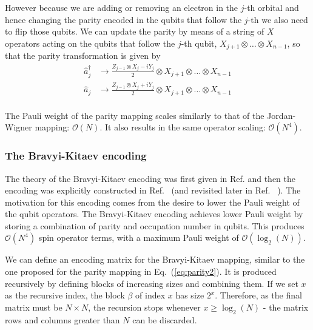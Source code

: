 However because we are adding or removing an electron in the $j$-th orbital and hence changing the parity encoded in the qubits that follow the $j$-th we also need to flip those qubits. We can update the parity by means of a string of $X$ operators acting on the qubits that follow the $j$-th qubit, $X_{j + 1} \otimes \dots \otimes X_{n - 1}$, so that the parity transformation is given by
\begin{equation}
\label{eq:parityladder2}
\begin{aligned}
\hat{a}_{j}^{\dagger} &\to \frac{Z_{j-1}\otimes X_{j} -i Y_{j}}{2} \otimes X_{j + 1} \otimes \dots \otimes X_{n-1} \\
\hat{a}_{j} &\to \frac{ Z_{j-1}\otimes X_{j} + i Y_{j}}{2} \otimes X_{j+1} \otimes \dots \otimes X_{n-1} \\
\end{aligned}
\end{equation}

The Pauli weight of the parity mapping scales similarly to that of the Jordan-Wigner mapping: $\mathcal{O}(N)$. It also results in the same operator scaling: $\mathcal{O}(N^4)$.  

\subsubsection{The Bravyi-Kitaev encoding} \label{sec:bravyi-kitaev}

The theory of the Bravyi-Kitaev encoding was first given in Ref. \cite{Bravyi2002} and then the encoding was explicitly constructed in Ref.~\cite{Seeley2012} (and revisited later in Ref.~ \cite{Tranter2015}). The motivation for this encoding comes from the desire to lower the Pauli weight of the qubit operators. The Bravyi-Kitaev encoding achieves lower Pauli weight by storing a combination of parity and occupation number in qubits. This produces $\mathcal{O}(N^4)$ spin operator terms, with a maximum Pauli weight of $\mathcal{O}(\log_2(N))$. 

We can define an encoding matrix for the Bravyi-Kitaev mapping, similar to the one proposed for the parity mapping in Eq.~(\ref{eq:parity2}). It is produced recursively by defining blocks of increasing sizes and combining them. If we set $x$ as the recursive index, the block $\beta$ of index $x$ has size $2^x$. Therefore, as the final matrix must be $N\times N$, the recursion stops whenever $x \geq \log_2(N)$ - the matrix rows and columns greater than $N$ can be discarded. 

